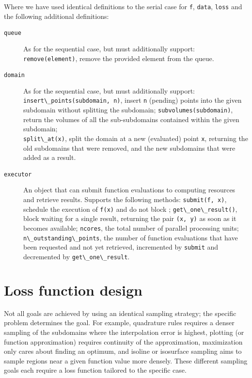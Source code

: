 Where we have used identical definitions to the serial case for \passthrough{\lstinline!f!}, \passthrough{\lstinline!data!}, \passthrough{\lstinline!loss!} and the following additional definitions:

\begin{description}
\item[\texttt{queue}]
As for the sequential case, but must additionally support: \passthrough{\lstinline!remove(element)!}, remove the provided element from the queue.
\item[\texttt{domain}]
As for the sequential case, but must additionally support:\\ \passthrough{\lstinline!insert\_points(subdomain, n)!}, insert \passthrough{\lstinline!n!} (pending) points into the given subdomain without splitting the subdomain; \passthrough{\lstinline!subvolumes(subdomain)!}, return the volumes of all the sub-subdomains contained within the given subdomain;\\ \passthrough{\lstinline!split\_at(x)!}, split the domain at a new (evaluated) point \passthrough{\lstinline!x!}, returning the old subdomains that were removed, and the new subdomains that were added as a result.
\item[\texttt{executor}]
An object that can submit function evaluations to computing resources and retrieve results.
Supports the following methods: \passthrough{\lstinline!submit(f, x)!}, schedule the execution of \passthrough{\lstinline!f(x)!} and do not block ; \passthrough{\lstinline!get\_one\_result()!}, block waiting for a single result, returning the pair \passthrough{\lstinline!(x, y)!} as soon as it becomes available; \passthrough{\lstinline!ncores!}, the total number of parallel processing units; \passthrough{\lstinline!n\_outstanding\_points!}, the number of function evaluations that have been requested and not yet retrieved, incremented by \passthrough{\lstinline!submit!} and decremented by \passthrough{\lstinline!get\_one\_result!}.
\end{description}

\hypertarget{sec:loss}{%
\section{Loss function design}\label{sec:loss}}


Not all goals are achieved by using an identical sampling strategy; the specific problem determines the goal.
For example, quadrature rules requires a denser sampling of the subdomains where the interpolation error is highest, plotting (or function approximation) requires continuity of the approximation, maximization only cares about finding an optimum, and isoline or isosurface sampling aims to sample regions near a given function value more densely.
These different sampling goals each require a loss function tailored to the specific case.

